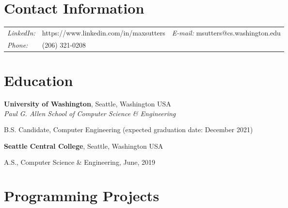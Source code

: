 \documentclass[margin,line]{res}
\newenvironment{list1}{
  \begin{list}{\ding{113}}{%
      \setlength{\itemsep}{0in}
      \setlength{\parsep}{0in} \setlength{\parskip}{0in}
      \setlength{\topsep}{0in} \setlength{\partopsep}{0in} 
      \setlength{\leftmargin}{0.17in}}}{\end{list}}
\begin{document}
\thispagestyle{empty}


\begin{resume}
\section{\sc Contact Information}
\vspace{.05in}
\begin{tabular}{@{}p{0.5in}p{2.5in}p{3in}}
{\it LinkedIn:} & https://www.linkedin.com/in/maxsutters      
							& {\it E-mail:}  msutters@cs.washington.edu \\   
							{\it Phone:}  & (206) 321-0208      \\   
\end{tabular}


\section{\sc Education}
{\bf University of Washington}, Seattle, Washington USA\\
{\em Paul G. Allen School of Computer Science \& Engineering} 
\vspace*{.1cm} 
\begin{list1}
\item[] B.S. Candidate, Computer Engineering (expected
  graduation date: December 2021)
\end{list1}

{\bf Seattle Central College}, Seattle, Washington USA %
\\

\vspace*{-.3cm}
\begin{list1}
\item[] A.S., Computer Science \& Engineering, June, 2019
\end{list1}

\section{\sc Programming Projects}


\end{resume}
\end{document}
